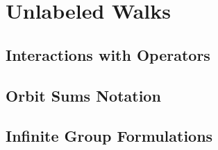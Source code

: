 
\chapter{Unlabeled Walks}

\section{Interactions with Operators}
\section{Orbit Sums Notation}
\section{Infinite Group Formulations}
\endinput
